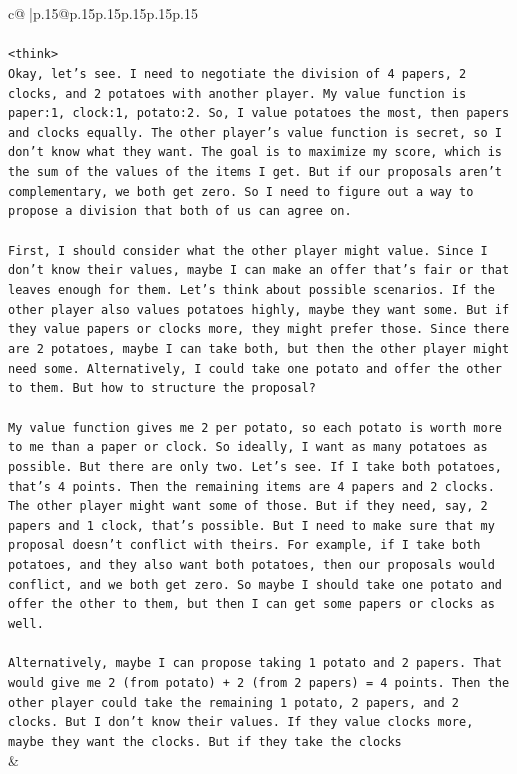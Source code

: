 \documentclass{article}
\begin{document}
{\begin{supertabular}{c@{$\;$}|p{.15\linewidth}@{}p{.15\linewidth}p{.15\linewidth}p{.15\linewidth}p{.15\linewidth}p{.15\linewidth}}
{{{\\ 
\\ 
\texttt{<think>} \\
\texttt{Okay, let's see. I need to negotiate the division of 4 papers, 2 clocks, and 2 potatoes with another player. My value function is paper:1, clock:1, potato:2. So, I value potatoes the most, then papers and clocks equally. The other player's value function is secret, so I don't know what they want. The goal is to maximize my score, which is the sum of the values of the items I get. But if our proposals aren't complementary, we both get zero. So I need to figure out a way to propose a division that both of us can agree on.} \\
\\ 
\texttt{First, I should consider what the other player might value. Since I don't know their values, maybe I can make an offer that's fair or that leaves enough for them. Let's think about possible scenarios. If the other player also values potatoes highly, maybe they want some. But if they value papers or clocks more, they might prefer those. Since there are 2 potatoes, maybe I can take both, but then the other player might need some. Alternatively, I could take one potato and offer the other to them. But how to structure the proposal?} \\
\\ 
\texttt{My value function gives me 2 per potato, so each potato is worth more to me than a paper or clock. So ideally, I want as many potatoes as possible. But there are only two. Let's see. If I take both potatoes, that's 4 points. Then the remaining items are 4 papers and 2 clocks. The other player might want some of those. But if they need, say, 2 papers and 1 clock, that's possible. But I need to make sure that my proposal doesn't conflict with theirs. For example, if I take both potatoes, and they also want both potatoes, then our proposals would conflict, and we both get zero. So maybe I should take one potato and offer the other to them, but then I can get some papers or clocks as well.} \\
\\ 
\texttt{Alternatively, maybe I can propose taking 1 potato and 2 papers. That would give me 2 (from potato) + 2 (from 2 papers) = 4 points. Then the other player could take the remaining 1 potato, 2 papers, and 2 clocks. But I don't know their values. If they value clocks more, maybe they want the clocks. But if they take the clocks} \\
            }
        }
    }
    & \\ \\


\end{supertabular}}
\end{document}
